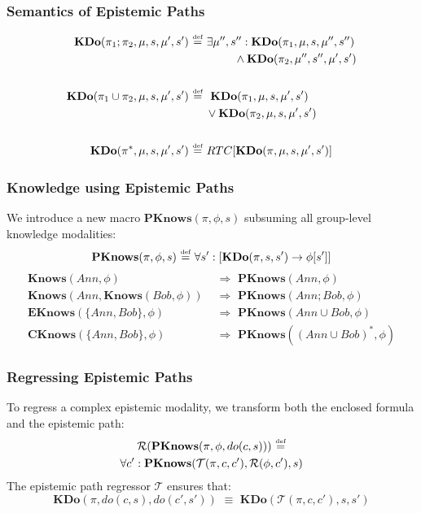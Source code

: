 \documentclass[compress]{beamer}
\newcommand{\isdef}{\hbox{$\stackrel{\mbox{\tiny def}}{=}$}}
\newcommand{\Reg}{\mathcal{R}}
\newcommand{\Trn}{\mathcal{T}}
\newcommand{\EKnows}{\mathbf{EKnows}}
\newcommand{\Knows}{\mathbf{Knows}}
\newcommand{\CKnows}{\mathbf{CKnows}}
\newcommand{\PKnows}{\mathbf{PKnows}}
\newcommand{\KDo}{\mathbf{KDo}}
\begin{document}
\begin{frame}
\frametitle{Semantics of Epistemic Paths}
\begin{align*}
\KDo(\pi_1 ; \pi_2,\mu,s,\mu',s') & \,\,\isdef\,\,\exists \mu'',s'': \KDo(\pi_1,\mu,s,\mu'',s'') \\
\,\,  & \,\,\,\,\,\,\,\,\,\,\,\,\,\,\,\,\,\,\,\,\,\,\,\, \wedge \KDo(\pi_2,\mu'',s'',\mu',s')\\
 & \\
\KDo(\pi_1 \cup \pi_2,\mu,s,\mu',s') & \,\,\isdef\,\,\,\, \KDo(\pi_1,\mu,s,\mu',s') \\
\,\,  & \,\,\,\,\,\,\,\,\, \vee \KDo(\pi_2,\mu,s,\mu',s')\\
 & \\
\KDo(\pi^{*},\mu,s,\mu',s') & \,\,\isdef\,\, RTC[\KDo(\pi,\mu,s,\mu',s')]
\end{align*}
\end{frame}

\begin{frame}
\frametitle{Knowledge using Epistemic Paths}
We introduce a new macro $\PKnows(\pi,\phi,s)$ subsuming all group-level knowledge modalities:
\begin{equation*}
\PKnows(\pi,\phi,s)\,\,\isdef\,\,\forall s': \left[ \KDo(\pi,s,s') \rightarrow \phi[s']\right]
\end{equation*}
\pause
\begin{align*}
\Knows(Ann,\phi) &  \,\,\Rightarrow\,\,\PKnows(Ann,\phi) \\
\Knows(Ann,\Knows(Bob,\phi)) & \,\,\Rightarrow\,\,\PKnows(Ann ; Bob,\phi) \\
\EKnows(\{Ann,Bob\},\phi) & \,\,\Rightarrow\,\,\PKnows(Ann \cup Bob,\phi) \\
\CKnows(\{Ann,Bob\},\phi) & \,\,\Rightarrow\,\,\PKnows((Ann \cup Bob)^*,\phi)
\end{align*}
\end{frame}

\begin{frame}
\frametitle{Regressing Epistemic Paths}
To regress a complex epistemic modality, we transform both the enclosed formula and the epistemic path:
\begin{multline*}
\Reg(\PKnows(\pi,\phi,do(c,s)))\,\,\isdef \\
  \forall c': \PKnows(\Trn(\pi,c,c'),\Reg(\phi,c'),s)
\end{multline*}
The epistemic path regressor $\Trn$ ensures that:
\begin{equation*}
\KDo(\pi,do(c,s),do(c',s'))\,\,\equiv\,\,\KDo(\Trn(\pi,c,c'),s,s')
\end{equation*}
\end{frame}
\end{document}
